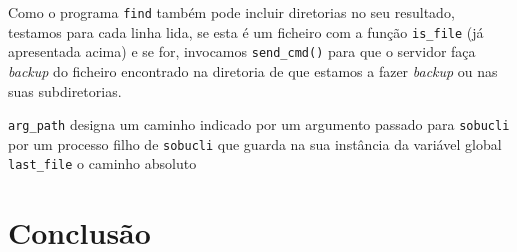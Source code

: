 \documentclass[a4paper,12pt,titlepage,draft,portuguese]{article}
\begin{document}
Como o programa \texttt{find} também pode incluir diretorias no seu resultado, testamos para cada linha lida, se esta é um ficheiro com a função \texttt{is\_file} (já apresentada acima) e se for, invocamos \texttt{send\_cmd()} para que o servidor faça \emph{backup} do ficheiro encontrado na diretoria de que estamos a fazer \emph{backup} ou nas suas subdiretorias. 

	

\texttt{arg_path} designa um caminho indicado por um argumento passado para \texttt{sobucli} por um processo filho de \texttt{sobucli} que guarda na sua instância da variável global \texttt{last_file} o caminho absoluto 

\section{Conclusão}
\end{document}
